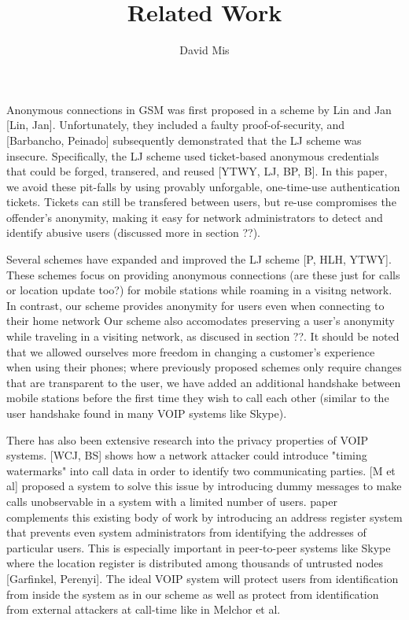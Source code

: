 \documentclass[11pt]{article}
\begin{document}
\title{Related Work}
\author{David Mis}

\maketitle

Anonymous connections in GSM was first proposed in a scheme by Lin and Jan [Lin, Jan]. Unfortunately, they included a faulty proof-of-security, and [Barbancho, Peinado] subsequently demonstrated that the LJ scheme was insecure. Specifically, the LJ scheme used ticket-based anonymous credentials that could be forged, transered, and reused [YTWY, LJ, BP, B]. In this paper, we avoid these pit-falls by using provably unforgable, one-time-use authentication tickets. Tickets can still be transfered between users, but re-use compromises the offender's anonymity, making it easy for network administrators to detect and identify abusive users (discussed more in section ??). 
	
Several schemes have expanded and improved the LJ scheme [P, HLH, YTWY]. These schemes focus on providing anonymous connections (are these just for calls or location update too?) for mobile stations while roaming in a visitng network. In contrast, our scheme provides anonymity for users even when connecting to their home network Our scheme also accomodates preserving a user's anonymity while traveling in a visiting network, as discused in section ??. It should be noted that we allowed ourselves more freedom in changing a customer's experience when using their phones; where previously proposed schemes only require changes that are transparent to the user, we have added an additional handshake between mobile stations before the first time they wish to call each other (similar to the user handshake found in many VOIP systems like Skype).

There has also been extensive research into the privacy properties of VOIP systems. [WCJ, BS] shows how a network attacker could introduce "timing watermarks" into call data in order to identify two communicating parties. [M et al] proposed a system to solve this issue by introducing dummy messages to make calls unobservable in a system with a limited number of users.  paper complements this existing body of work by introducing an address register system that prevents even system administrators from identifying the addresses of particular users. This is especially important in peer-to-peer systems like Skype where the location register is distributed among thousands of untrusted nodes [Garfinkel, Perenyi]. The ideal VOIP system will protect users from identification from inside the system as in our scheme as well as protect from identification from external attackers at call-time like in Melchor et al.   
\end{document}
